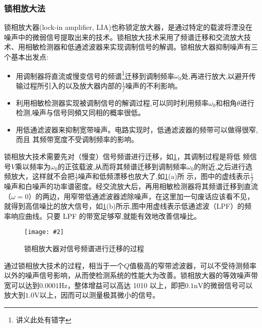 \documentclass[11pt,a4paper]{ctexart}
\newcommand{\cpic}[2]{
\begin{center}
\texttt{[image: \#2]}
\end{center}
}
\newcommand{\cpicn}[3]
{
\begin{figure}[H]
\cpic{#1}{#2}
\caption{#3\label{#2}}
\end{figure}
}
\begin{document}
\subsubsection{锁相放大法}
\par
锁相放大器(lock-in amplifier, LIA)也称锁定放大器，是通过特定的载波将湮没在噪声中的微弱信号提取出来的技术。锁相放大技术采用了频谱迁移和交流放大技术、用相敏检测器和低通滤波器来实现调制信号的解调。锁相放大器抑制噪声有三个基本出发点:
\begin{itemize}
\item 用调制器将直流或慢变信号的频谱\footnote{讲义此处有错字}迁移到调制频率$\omega_0$处,再进行放大,以避开传输过程所引入的以及放大器内部的$\frac{1}{f}$噪声的不利影响。
\item 利用相敏检测器实现被调制信号的解调过程,可以同时利用频率$\omega_0$和相角$\theta$进行检测,噪声与信号同頻又同相的概率很低。
\item 用低通滤波器来抑制宽带噪声。电路实现时，低通滤波器的频带可以做得很窄,而且 其频带宽度不受调制频率的影响。
\end{itemize}
锁相放大技术需要先对（慢变）信号频谱进行迁移，如\cref{d17}，其调制过程是将低 频信号$V$乘以频率为$\omega_0$的正弦载波,从而将其频谱迁移到调制频率$\omega_0$的附近,之后进行选频放大，这样就不会把$\frac{1}{f}$噪声和低频漂移也放大了,如\cref{d17}(a)所 示，图中的虚线表示$\frac{1}{f}$噪声和白噪声的功率谱密度。经交流放大后，再用相敏检测器将其频谱迁移到直流（$\omega = 0$）的两边，用窄带低通滤波器滤除噪声，在这里加一句废话应该看不见，就得到高信噪比的放大信号，如\cref{d17}(b)所示,图中用虚线表示低通滤波（LPF）的频率响应曲线。只要 LPF 的带宽足够窄,就能有效地改善信噪比。
\cpicn{0.6}{d17}{锁相放大器对信号频谱进行迁移的过程}
通过锁相放大技术的过程，相当于一个$Q$值极高的窄带滤波器，可以不受待测频率以外的噪声信号影响，从而使检测系统的性能大为改善。锁相放大器的等效噪声带宽可以达到$0.0001\mathrm{Hz}$，整体增益可以高达 1010 以上，即把$0.1\mathrm{nV}$的微弱信号可以放大到$1.0\mathrm{V}$以上，因而可以测量极其微小的信号。
\end{document}
